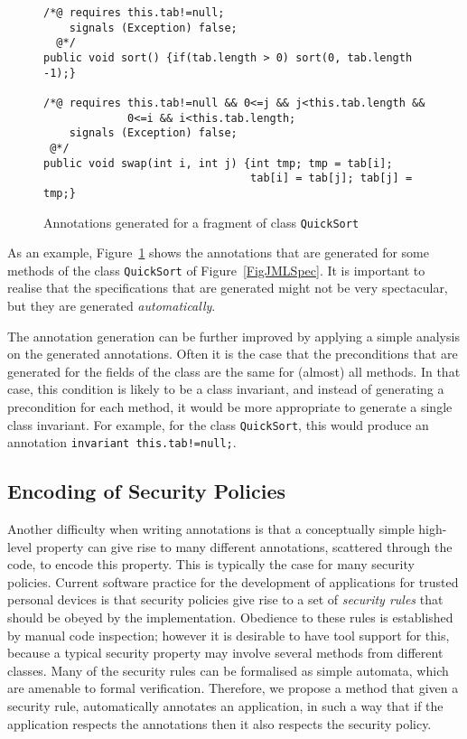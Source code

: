 
\begin{figure}[t!]
{\small
\begin{verbatim}
/*@ requires this.tab!=null;
    signals (Exception) false;
  @*/
public void sort() {if(tab.length > 0) sort(0, tab.length -1);}

/*@ requires this.tab!=null && 0<=j && j<this.tab.length &&
             0<=i && i<this.tab.length;
    signals (Exception) false;
 @*/
public void swap(int i, int j) {int tmp; tmp = tab[i]; 
                                tab[i] = tab[j]; tab[j] = tmp;}
\end{verbatim}
}
\caption{Annotations generated for a fragment of class
\texttt{QuickSort}}\label{FigAnnotSpec} 
\end{figure}

As an example, Figure~\ref{FigAnnotSpec} shows the annotations that
are generated for some methods of the class \texttt{QuickSort} of
Figure~\ref{FigJMLSpec}.
It is important to realise that the specifications that
are generated might not be very spectacular, but they are
generated \emph{automatically}. %

The annotation generation can be further improved by applying a simple
analysis on the generated annotations. Often it is the case that the
preconditions that are generated for the fields of the class are the
same for (almost) all methods. In that case, this condition is likely
to be a class invariant, and instead of generating a precondition for
each method, it would be more appropriate to generate a single class
invariant. For example, for the class
\texttt{QuickSort}, this would produce an annotation
\texttt{invariant this.tab!=null;}. %

\subsection{Encoding of Security Policies}

Another difficulty when writing annotations is that a conceptually
simple high-level property can give rise to many different
annotations, scattered through the code, to encode this property. This
is typically the case for many security policies. Current software
practice for the development of applications for trusted personal
devices is that security policies give rise to a set of \emph{security
rules} that should be obeyed by the implementation. Obedience to these
rules is established by manual code inspection; however it is
desirable to have tool support for this, because a typical security
property may involve several methods from different classes.  Many of
the security rules can be formalised as simple automata, which are
amenable to formal verification. Therefore, we propose a method that
given a security rule, automatically annotates an application, in such
a way that if the application respects the annotations then it also
respects the security policy.

